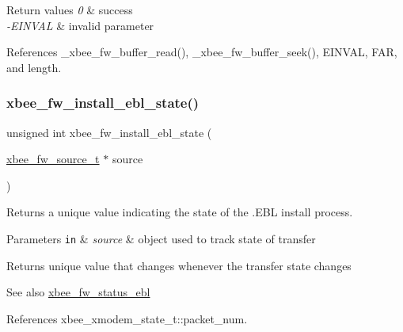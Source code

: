 \begin{DoxyRetVals}{Return values}
{\em 0} & success \\
\hline
{\em -\/\+E\+I\+N\+V\+AL} & invalid parameter \\
\hline
\end{DoxyRetVals}


References \+\_\+xbee\+\_\+fw\+\_\+buffer\+\_\+read(), \+\_\+xbee\+\_\+fw\+\_\+buffer\+\_\+seek(), E\+I\+N\+V\+AL, F\+AR, and length.

\mbox{\label{group__xbee__firmware_ga8590708a38ac57ace8c816cc7cfd0859}} 
\subsubsection{\texorpdfstring{xbee\+\_\+fw\+\_\+install\+\_\+ebl\+\_\+state()}{xbee\_fw\_install\_ebl\_state()}}
{\footnotesize\ttfamily unsigned int xbee\+\_\+fw\+\_\+install\+\_\+ebl\+\_\+state (\begin{DoxyParamCaption}\item[{\hyperlink{structxbee__fw__source__t}{xbee\+\_\+fw\+\_\+source\+\_\+t} $\ast$}]{source }\end{DoxyParamCaption})}



Returns a unique value indicating the state of the .E\+BL install process. 


\begin{DoxyParams}[1]{Parameters}
\mbox{\tt in}  & {\em source} & object used to track state of transfer\\
\hline
\end{DoxyParams}
\begin{DoxyReturn}{Returns}
unique value that changes whenever the transfer state changes
\end{DoxyReturn}
\begin{DoxySeeAlso}{See also}
\hyperlink{group__xbee__firmware_ga8bee6e4bb7564c51bb38129e97a12e99}{xbee\+\_\+fw\+\_\+status\+\_\+ebl} 
\end{DoxySeeAlso}


References xbee\+\_\+xmodem\+\_\+state\+\_\+t\+::packet\+\_\+num.

\mbox{\label{group__xbee__firmware_gaae62252a2e1331127c9df86b6ebfc4e8}} 
